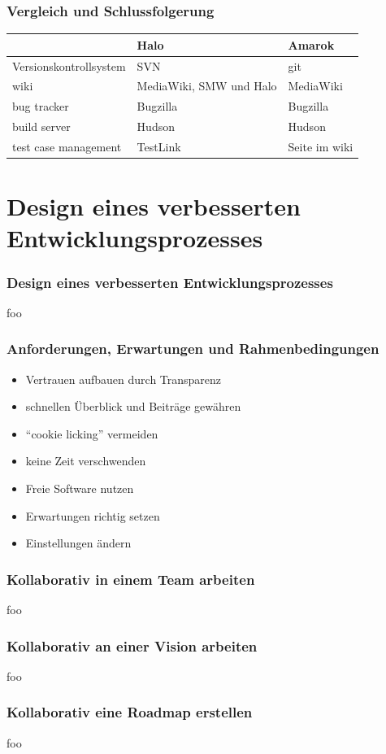 \documentclass{beamer}
\begin{document}
\begin{frame}
\frametitle{Vergleich und Schlussfolgerung}
\begin{tabularx}{\textwidth}{|X|X|X|}
\hline
 & Halo & Amarok\\
\hline \hline
Versionskontrollsystem & SVN & git\\
\hline
wiki & MediaWiki, SMW und Halo & MediaWiki\\
\hline
bug tracker & Bugzilla & Bugzilla\\
\hline
build server & Hudson & Hudson\\
\hline
test case management & TestLink & Seite im wiki\\
\hline
\end{tabularx}
\end{frame}

\section{Design eines verbesserten Entwicklungsprozesses}

\begin{frame}
\frametitle{Design eines verbesserten Entwicklungsprozesses}
foo
\end{frame}

\begin{frame}
\frametitle{Anforderungen, Erwartungen und Rahmenbedingungen}
\begin{itemize}
 \item Vertrauen aufbauen durch Transparenz
 \item schnellen \"Uberblick und Beitr\"age gew\"ahren
 \item ``cookie licking'' vermeiden
 \item keine Zeit verschwenden
 \item Freie Software nutzen
 \item Erwartungen richtig setzen
 \item Einstellungen \"andern
\end{itemize}
\end{frame}

\begin{frame}
\frametitle{Kollaborativ in einem Team arbeiten}
foo
\end{frame}

\begin{frame}
\frametitle{Kollaborativ an einer Vision arbeiten}
foo
\end{frame}

\begin{frame}
\frametitle{Kollaborativ eine Roadmap erstellen}
foo
\end{frame}
\end{document}

